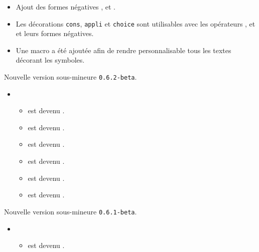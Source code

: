 \documentclass[12pt,a4paper]{book}
\begin{document}
\begin{description}
\begin{itemize}[itemsep=.5em]
\begin{itemize}[itemsep=.5em]
        \item Ajout des formes négatives ,  et .

        \item Les décorations \verb+cons+, \verb+appli+ et \verb+choice+ sont utilisables avec les opérateurs ,  et  et leurs formes négatives.

        \item Une macro  a été ajoutée afin de rendre personnalisable tous les textes décorant les symboles.
    \end{itemize}
\end{itemize}

\end{description}\begin{description}
\medskip
\item[2019-10-14] Nouvelle version sous-mineure \verb+0.6.2-beta+.

\begin{itemize}[itemsep=.5em]
    \item {}
    \begin{itemize}[itemsep=.5em]
        \item {} est devenu .

        \item {} est devenu .

        \item {} est devenu .

        \item {} est devenu .

        \item {} est devenu .

        \item {} est devenu .
    \end{itemize}
\end{itemize}

\end{description}\begin{description}
\medskip
\item[2019-10-13] Nouvelle version sous-mineure \verb+0.6.1-beta+.

\begin{itemize}[itemsep=.5em]
    \item {}
    \begin{itemize}[itemsep=.5em]
        \item {} est devenu .


\end{itemize}
\end{itemize}
\end{description}
\end{document}
